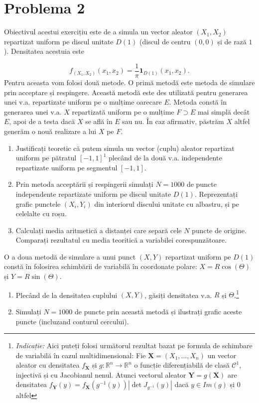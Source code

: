 \documentclass[]{article}
\let\rmarkdownfootnote\footnote%
\def\footnote{\protect\rmarkdownfootnote}
\begin{document}
\section{Problema 2}\label{problema-2}

Obiectivul acestui exercițiu este de a simula un vector aleator
\((X_1,X_2)\) repartizat uniform pe discul unitate \(D(1)\) (discul de
centru \((0,0)\) și de rază \(1\)). Densitatea acestuia este

\[
f_{(X_1,X_2)}(x_1,x_2) = \frac{1}{\pi}\mathbf{1}_{D(1)}(x_1,x_2).
\] Pentru aceasta vom folosi două metode. O primă metodă este metoda de
simulare prin acceptare și respingere. Această metodă este des utilizată
pentru generarea unei v.a. repartizate uniform pe o mulțime oarecare
\(E\). Metoda constă în generarea unei v.a. \(X\) repartizată uniform pe
o mulțime \(F\supset E\) mai simplă decât \(E\), apoi de a testa dacă
\(X\) se află în \(E\) sau nu. În caz afirmativ, păstrăm \(X\) altfel
generăm o nouă realizare a lui \(X\) pe \(F\).

\begin{enumerate}
\def\labelenumi{\arabic{enumi}.}
\item
  Justificați teoretic că putem simula un vector (cuplu) aleator
  repartizat uniform pe pătratul \([-1,1]^1\) plecând de la două v.a.
  independente repartizate uniform pe segmentul \([-1,1]\).
\item
  Prin metoda acceptării și respingerii simulați \(N=1000\) de puncte
  independente repartizate uniform pe discul unitate \(D(1)\).
  Reprezentați grafic punctele \((X_i,Y_i)\) din interiorul discului
  unitate cu albastru, și pe celelalte cu roșu.
\item
  Calculați media aritmetică a distanței care separă cele \(N\) puncte
  de origine. Comparați rezultatul cu media teoritică a variabilei
  corespunzătoare.
\end{enumerate}

O a doua metodă de simulare a unui punct \((X,Y)\) repartizat uniform pe
\(D(1)\) constă în folosirea schimbării de variabilă în coordonate
polare: \(X=R\cos(\Theta)\) și \(Y=R\sin(\Theta)\).

\begin{enumerate}
\def\labelenumi{\arabic{enumi}.}
\setcounter{enumi}{3}
\item
  Plecând de la densitatea cuplului \((X,Y)\), găsiți densitatea v.a.
  \(R\) și \(\Theta\).\footnote{\emph{Indicație:} Aici puteți folosi
    următorul rezultat bazat pe formula de schimbare de variabilă în
    cazul multidimensional: Fie \(\textbf{X}=(X_1, \ldots, X_n)\) un
    vector aleator cu densitatea \(f_{\textbf{X}}\) și
    \(g:\mathbb{R}^n\to\mathbb{R}^n\) o funcție diferențiabilă de clasă
    \(\mathcal{C}^1\), injectivă și cu Jacobianul nenul. Atunci vectorul
    aleator \(\textbf{Y}=g(\textbf{X})\) are densitatea
    \(f_{\textbf{Y}}(y) = f_{\textbf{X}}\left(g^{-1}(y)\right)\left|\det J_{g^{-1}}(y)\right|\)
    dacă \(y\in Im(g)\) și \(0\) altfel}
\item
  Simulați \(N=1000\) de puncte prin această metodă și ilustrați grafic
  aceste puncte (incluzand conturul cercului).
\end{enumerate}
\end{document}
